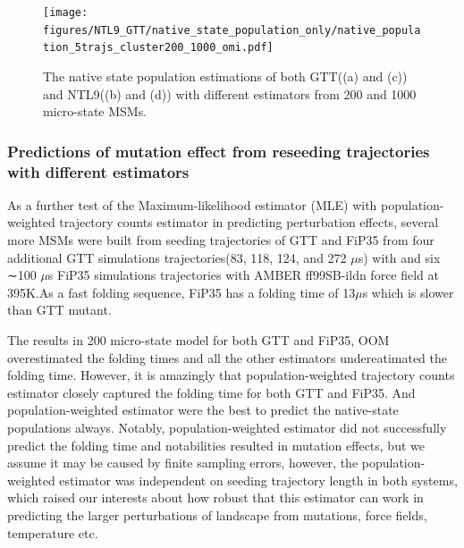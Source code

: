 \documentclass[%
 aip,
rsi,%
 amsmath,amssymb,
 reprint,%
]{revtex4-1}
\begin{document}
\begin{figure}
\texttt{[image: figures/NTL9\_GTT/native\_state\_population\_only/native\_population\_5trajs\_cluster200\_1000\_omi.pdf]}%
\caption{The native state population estimations of both GTT((a) and (c)) and NTL9((b) and (d)) with different estimators from 200 and 1000 micro-state MSMs.}
\end{figure}


\subsubsection{Predictions of mutation effect from reseeding trajectories with different estimators}

As a further test of the Maximum-likelihood estimator (MLE) with population-weighted trajectory counts estimator in predicting perturbation effects, several more MSMs were built from seeding trajectories of GTT and FiP35 from four additional GTT simulations trajectories(83, 118, 124, and 272 $\mu$s)\cite{HoubiNguyen:2005ec,Piana:2011gma} with and six ∼100 $\mu$s FiP35 simulations trajectories with AMBER ff99SB-ildn force field at 395K\cite{Shaw:2010ge,Piana:2011gma}.As a fast folding sequence, FiP35 has a folding time of 13$\mu$s which is slower than GTT mutant\cite{Nguyen:2005ec}. 

The results in 200 micro-state model for both GTT and FiP35, OOM overestimated the folding times and all the other estimators undereatimated the folding time. However, it is amazingly that population-weighted trajectory counts estimator closely captured the folding time for both GTT and FiP35. And population-weighted estimator were the best to predict the native-state populations always. Notably, population-weighted estimator did not successfully predict the folding time and notabilities resulted in mutation effects, but we assume it may be caused by finite sampling errors, however, the population-weighted estimator was independent on seeding trajectory length in both systems, which raised our interests about how robust that this estimator can work in predicting  the larger perturbations of landscape from mutations, force fields, temperature etc.
\end{document}
